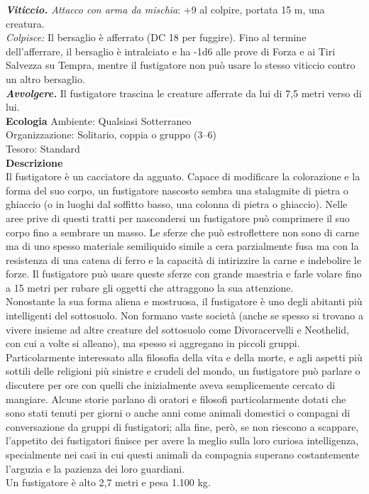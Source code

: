 \begin{multicols}{2}
\emph{\textbf{Viticcio.} Attacco con arma da mischia}: +9 al colpire, portata 15 m, una creatura.\\
\emph{Colpisce:} Il bersaglio è afferrato (DC  18 per fuggire). Fino al termine dell'afferrare, il bersaglio è intralciato e ha -1d6 alle prove di Forza e ai Tiri Salvezza su Tempra, mentre il fustigatore non può usare lo stesso viticcio contro un altro bersaglio.\\
\emph{\textbf{Avvolgere.}} Il fustigatore trascina le creature afferrate da lui di 7,5 metri verso di lui.\\
\textbf{Ecologia}
Ambiente: Qualsiasi Sotterraneo\\
Organizzazione: Solitario, coppia o gruppo (3–6)\\
Tesoro: Standard\\
\textbf{Descrizione}\\
Il fustigatore è un cacciatore da agguato. Capace di modificare la colorazione e la forma del suo corpo, un fustigatore nascosto sembra una stalagmite di pietra o ghiaccio (o in luoghi dal soffitto basso, una colonna di pietra o ghiaccio). Nelle aree prive di questi tratti per nascondersi un fustigatore può comprimere il suo corpo fino a sembrare un masso. Le sferze che può estroflettere non sono di carne ma di uno spesso materiale semiliquido simile a cera parzialmente fusa ma con la resistenza di una catena di ferro e la capacità di intirizzire la carne e indebolire le forze. Il fustigatore può usare queste sferze con grande maestria e farle volare fino a 15 metri per rubare gli oggetti che attraggono la sua attenzione.\\

Nonostante la sua forma aliena e mostruosa, il fustigatore è uno degli abitanti più intelligenti del sottosuolo. Non formano vaste società (anche se spesso si trovano a vivere insieme ad altre creature del sottosuolo come Divoracervelli e Neothelid, con cui a volte si alleano), ma spesso si aggregano in piccoli gruppi. Particolarmente interessato alla filosofia della vita e della morte, e agli aspetti più sottili delle religioni più sinistre e crudeli del mondo, un fustigatore può parlare o discutere per ore con quelli che inizialmente aveva semplicemente cercato di mangiare. Alcune storie parlano di oratori e filosofi particolarmente dotati che sono stati tenuti per giorni o anche anni come animali domestici o compagni di conversazione da gruppi di fustigatori; alla fine, però, se non riescono a scappare, l'appetito dei fustigatori finisce per avere la meglio sulla loro curiosa intelligenza, specialmente nei casi in cui questi animali da compagnia superano costantemente l'arguzia e la pazienza dei loro guardiani.\\
Un fustigatore è alto 2,7 metri e pesa 1.100 kg.\\


\end{multicols}

